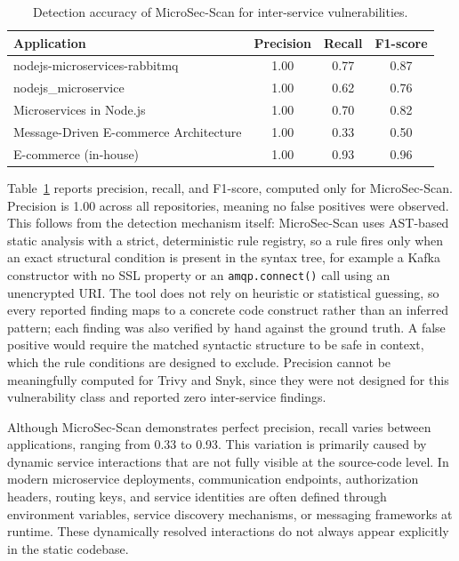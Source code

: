 \documentclass[preprint,12pt]{elsarticle}
\newcommand{\new}[1]{#1}
\newcommand{\safefixtablestyle}{%
  \small
  \setlength{\tabcolsep}{5pt}
  \renewcommand{\arraystretch}{1.15}
}
\begin{document}
\begin{table}[!t]
\centering
\caption{Detection accuracy of MicroSec-Scan for inter-service vulnerabilities.}
\label{tab:microsec_accuracy}
\safefixtablestyle
\begin{tabular}{@{} l c c c @{}}
\toprule
\textbf{Application} & \textbf{Precision} & \textbf{Recall} & \textbf{F1-score} \\
\midrule
nodejs-microservices-rabbitmq & 1.00 & 0.77 & 0.87 \\
nodejs\_microservice & 1.00 & \new{0.62} & \new{0.76} \\
Microservices in Node.js & 1.00 & 0.70 & \new{0.82} \\
Message-Driven E-commerce Architecture & 1.00 & 0.33 & 0.50 \\
E-commerce (in-house) & 1.00 & 0.93 & 0.96 \\
\bottomrule
\end{tabular}
\end{table}

Table~\ref{tab:microsec_accuracy} reports precision, recall, and F1-score, computed only for MicroSec-Scan. Precision is 1.00 across all repositories, meaning no false positives were observed. \new{This follows from the detection mechanism itself: MicroSec-Scan uses AST-based static analysis with a strict, deterministic rule registry, so a rule fires only when an exact structural condition is present in the syntax tree, for example a Kafka constructor with no SSL property or an \texttt{amqp.connect()} call using an unencrypted URI. The tool does not rely on heuristic or statistical guessing, so every reported finding maps to a concrete code construct rather than an inferred pattern; each finding was also verified by hand against the ground truth. A false positive would require the matched syntactic structure to be safe in context, which the rule conditions are designed to exclude.} Precision cannot be meaningfully computed for Trivy and Snyk, since they were not designed for this vulnerability class and reported zero inter-service findings.



Although MicroSec-Scan demonstrates perfect precision, recall varies between applications, ranging from 0.33 to 0.93. This variation is primarily caused by dynamic service interactions that are not fully visible at the source-code level. In modern microservice deployments, communication endpoints, authorization headers, routing keys, and service identities are often defined through environment variables, service discovery mechanisms, or messaging frameworks at runtime. These dynamically resolved interactions do not always appear explicitly in the static codebase.
\end{document}
